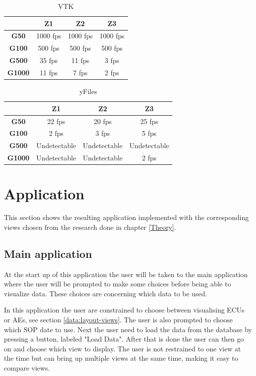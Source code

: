 \documentclass[a4paper,11pt]{kth-mag}
\begin{document}
\newline
\begin{table}[h]
\centering
\caption{VTK}
\begin{tabular}{|c|c|c|c|}
\hline
\textbf{}      & \textbf{Z1} & \textbf{Z2} & \textbf{Z3} \\ \hline
\textbf{G50}   & 1000 fps    & 1000 fps    & 1000 fps    \\ \hline
\textbf{G100}  & 500 fps     & 500 fps     & 500 fps     \\ \hline
\textbf{G500}  & 35 fps      & 11 fps      & 3 fps       \\ \hline
\textbf{G1000} & 11 fps      & 7 fps       & 2 fps       \\ \hline
\end{tabular}
\label{table-VTK}
\end{table}
\newline
\begin{table}[h]
\centering
\caption{yFiles}
\begin{tabular}{|c|c|c|c|}
\hline
\textbf{}      & \textbf{Z1}  & \textbf{Z2}  & \textbf{Z3}  \\ \hline
\textbf{G50}   & 22 fps       & 20 fps       & 25 fps       \\ \hline
\textbf{G100}  & 2 fps        & 3 fps        & 5 fps        \\ \hline
\textbf{G500}  & Undetectable & Undetectable & Undetectable \\ \hline
\textbf{G1000} & Undetectable & Undetectable & 2 fps        \\ \hline
\end{tabular}
\label{table-yFiles}
\end{table}

\section{Application}
\label{sec:application}
This section shows the resulting application implemented with the corresponding views chosen from the research done in chapter \ref{Theory}.
\subsection{Main application}
At the start up of this application the user will be taken to the main application where the user will be prompted to make some choices before being able to visualize data. 
These choices are concerning which data to be used. 

In this application the user are constrained to choose between visualising ECUs or AEs, see section \ref{data:layout-views}. The user is also prompted to choose which SOP date to use. Next the user 
need to load the data from the database by pressing a button, labeled "Load Data". After that is done the user can then go on and choose which view to display. The user is not restrained to one view at the 
time but can bring up multiple views at the same time, making it easy to compare views.
\end{document}
